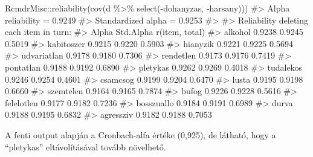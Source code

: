 \documentclass[
  letterpaper,
]{krantz}
\makeatletter
\newenvironment{Shaded}{\begin{snugshade}}{\end{snugshade}}
\newcommand{\CommentTok}[1]{\textcolor[rgb]{0.37,0.37,0.37}{#1}}
\newcommand{\FunctionTok}[1]{\textcolor[rgb]{0.28,0.35,0.67}{#1}}
\newcommand{\NormalTok}[1]{\textcolor[rgb]{0.00,0.23,0.31}{#1}}
\newcommand{\SpecialCharTok}[1]{\textcolor[rgb]{0.37,0.37,0.37}{#1}}
\newenvironment{kframe}{%
\medskip{}
\setlength{\fboxsep}{.8em}
 \def\at@end@of@kframe{}%
 \ifinner\ifhmode%
  \def\at@end@of@kframe{\end{minipage}}%
  \begin{minipage}{\columnwidth}%
 \fi\fi%
 \def\FrameCommand##1{\hskip\@totalleftmargin \hskip-\fboxsep
 \colorbox{shadecolor}{##1}\hskip-\fboxsep
     \hskip-\linewidth \hskip-\@totalleftmargin \hskip\columnwidth}%
 \MakeFramed {\advance\hsize-\width
   \@totalleftmargin\z@ \linewidth\hsize
   \@setminipage}}%
 {\par\unskip\endMakeFramed%
 \at@end@of@kframe}
\renewenvironment{Shaded}{\begin{kframe}}{\end{kframe}}
\makeatother
\begin{document}
\begin{Shaded}
\begin{Highlighting}[]
\NormalTok{RcmdrMisc}\SpecialCharTok{::}\FunctionTok{reliability}\NormalTok{(}\FunctionTok{cov}\NormalTok{(d }\SpecialCharTok{\%\textgreater{}\%}
    \FunctionTok{select}\NormalTok{(}\SpecialCharTok{{-}}\NormalTok{dohanyzas, }\SpecialCharTok{{-}}\NormalTok{harsany)))}
\CommentTok{\#\textgreater{} Alpha reliability =  0.9249 }
\CommentTok{\#\textgreater{} Standardized alpha =  0.9253 }
\CommentTok{\#\textgreater{} }
\CommentTok{\#\textgreater{} Reliability deleting each item in turn:}
\CommentTok{\#\textgreater{}              Alpha Std.Alpha r(item, total)}
\CommentTok{\#\textgreater{} alkohol     0.9238    0.9245         0.5019}
\CommentTok{\#\textgreater{} kabitoszer  0.9215    0.9220         0.5903}
\CommentTok{\#\textgreater{} hianyzik    0.9221    0.9225         0.5694}
\CommentTok{\#\textgreater{} udvariatlan 0.9178    0.9180         0.7306}
\CommentTok{\#\textgreater{} rendetlen   0.9173    0.9176         0.7419}
\CommentTok{\#\textgreater{} pontatlan   0.9188    0.9192         0.6890}
\CommentTok{\#\textgreater{} pletykas    0.9262    0.9269         0.4018}
\CommentTok{\#\textgreater{} tudalekos   0.9246    0.9254         0.4601}
\CommentTok{\#\textgreater{} csamcsog    0.9199    0.9204         0.6470}
\CommentTok{\#\textgreater{} lusta       0.9195    0.9198         0.6660}
\CommentTok{\#\textgreater{} szemtelen   0.9164    0.9165         0.7874}
\CommentTok{\#\textgreater{} bufog       0.9226    0.9228         0.5616}
\CommentTok{\#\textgreater{} felelotlen  0.9177    0.9182         0.7236}
\CommentTok{\#\textgreater{} bosszuallo  0.9184    0.9191         0.6989}
\CommentTok{\#\textgreater{} durva       0.9188    0.9195         0.6832}
\CommentTok{\#\textgreater{} agressziv   0.9182    0.9188         0.7053}
\end{Highlighting}
\end{Shaded}

A fenti output alapján a Cronbach-alfa értéke (0,925), de látható, hogy
a ``pletykas'' eltávolításával tovább növelhető.
\end{document}
